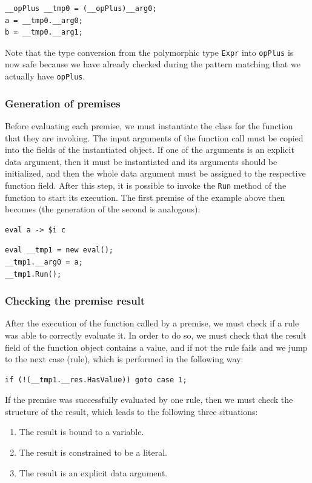 \begin{lstlisting}
__opPlus __tmp0 = (__opPlus)__arg0;
a = __tmp0.__arg0;
b = __tmp0.__arg1;
\end{lstlisting}

Note that the type conversion from the polymorphic type \texttt{Expr} into \texttt{opPlus} is now safe because we have already checked during the pattern matching that we actually have \texttt{opPlus}.

\subsubsection{Generation of premises}
Before evaluating each premise, we must instantiate the class for the function that they are invoking. The input arguments of the function call must be copied into the fields of the instantiated object. If one of the arguments is an explicit data argument, then it must be instantiated and its arguments should be initialized, and then the whole data argument must be assigned to the respective function field. After this step, it is possible to invoke the \texttt{Run} method of the function to start its execution. The first premise of the example above then becomes (the generation of the second is analogous):

\begin{lstlisting}
eval a -> $i c
\end{lstlisting}

\begin{lstlisting}
eval __tmp1 = new eval();
__tmp1.__arg0 = a;
__tmp1.Run();
\end{lstlisting}

\subsubsection{Checking the premise result}
After the execution of the function called by a premise, we must check if a rule was able to correctly evaluate it. In order to do so, we must check that the result field of the function object contains a value, and if not the rule fails and we jump to the next case (rule), which is performed in the following way:

\begin{lstlisting}
if (!(__tmp1.__res.HasValue)) goto case 1;
\end{lstlisting}

If the premise was successfully evaluated by one rule, then we must check the structure of the result, which leads to the following three situations:
\begin{enumerate}
	\item The result is bound to a variable.
	\item The result is constrained to be a literal.
	\item The result is an explicit data argument.
\end{enumerate}

